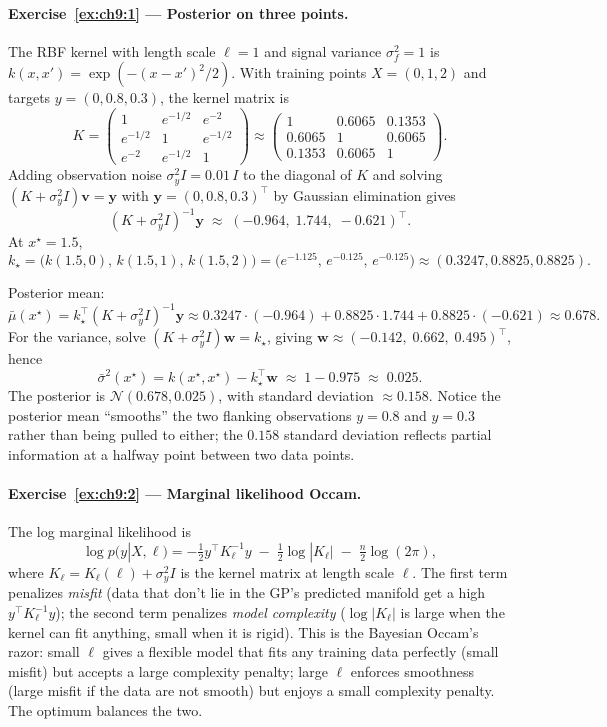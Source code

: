 \documentclass[11pt,a4paper]{report}
\begin{document}
\paragraph{Exercise~\ref{ex:ch9:1} --- Posterior on three points.}
The RBF kernel with length scale $\ell = 1$ and signal variance $\sigma_f^2 = 1$ is $k(x, x') = \exp(-(x-x')^2/2)$.  With training points $X = (0, 1, 2)$ and targets $y = (0, 0.8, 0.3)$, the kernel matrix is
\[
   K = \begin{pmatrix} 1 & e^{-1/2} & e^{-2} \\ e^{-1/2} & 1 & e^{-1/2} \\ e^{-2} & e^{-1/2} & 1\end{pmatrix}
   \approx \begin{pmatrix} 1 & 0.6065 & 0.1353 \\ 0.6065 & 1 & 0.6065 \\ 0.1353 & 0.6065 & 1\end{pmatrix}.
\]
Adding observation noise $\sigma_y^2 I = 0.01\,I$ to the diagonal of $K$ and solving $(K + \sigma_y^2 I)\bm v = \bm y$ with $\bm y = (0, 0.8, 0.3)^\top$ by Gaussian elimination gives
\[
   (K + \sigma_y^2 I)^{-1} \bm y \;\approx\; (-0.964,\; 1.744,\; -0.621)^\top.
\]
At $x^\star = 1.5$,
\[
   k_\star
   = \bigl(k(1.5,0),\, k(1.5,1),\, k(1.5,2)\bigr)
   = \bigl(e^{-1.125},\, e^{-0.125},\, e^{-0.125}\bigr)
   \approx (0.3247, 0.8825, 0.8825).
\]

Posterior mean:
\[
   \bar{\mu}(x^\star) = k_\star^\top (K + \sigma_y^2 I)^{-1} \bm y \approx 0.3247\cdot(-0.964) + 0.8825\cdot 1.744 + 0.8825\cdot(-0.621) \approx 0.678.
\]
For the variance, solve $(K + \sigma_y^2 I)\bm w = k_\star$, giving $\bm w \approx (-0.142,\; 0.662,\; 0.495)^\top$, hence
\[
   \bar{\sigma}^2(x^\star) = k(x^\star, x^\star) - k_\star^\top \bm w \;\approx\; 1 - 0.975 \;\approx\; 0.025.
\]
The posterior is $\mathcal{N}(0.678, 0.025)$, with standard deviation $\approx 0.158$.  Notice the posterior mean ``smooths'' the two flanking observations $y = 0.8$ and $y = 0.3$ rather than being pulled to either; the $0.158$ standard deviation reflects partial information at a halfway point between two data points.

\paragraph{Exercise~\ref{ex:ch9:2} --- Marginal likelihood Occam.}
The log marginal likelihood is
\[
   \log p(y | X, \ell) = -\tfrac{1}{2} y^\top K_\ell^{-1} y \;-\; \tfrac{1}{2} \log|K_\ell| \;-\; \tfrac{n}{2}\log(2\pi),
\]
where $K_\ell = K_\ell(\ell) + \sigma_y^2 I$ is the kernel matrix at length scale $\ell$.  The first term penalizes \emph{misfit} (data that don't lie in the GP's predicted manifold get a high $y^\top K_\ell^{-1} y$); the second term penalizes \emph{model complexity} ($\log|K_\ell|$ is large when the kernel can fit anything, small when it is rigid).  This is the Bayesian Occam's razor: small $\ell$ gives a flexible model that fits any training data perfectly (small misfit) but accepts a large complexity penalty; large $\ell$ enforces smoothness (large misfit if the data are not smooth) but enjoys a small complexity penalty.  The optimum balances the two.
\end{document}
